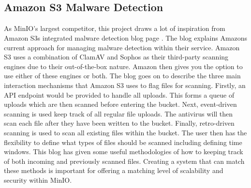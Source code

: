 \documentclass[12pt, conference, final, a4paper, onecolumn, compsoc]{IEEEtran}
\begin{document}
%

%

\subsection*{Amazon S3 Malware Detection} %
\paragraph{}

As MinIO's largest competitor, this project draws a lot of inspiration from
Amazon S3s integrated malware detection blog page \citep{amazon-md}. The blog
explains Amazons current approach for managing malware detection within their
service. Amazon S3 uses a combination of ClamAV and Sophos as their third-party
scanning engines due to their out-of-the-box nature. Amazon then gives you the
option to use either of these engines or both. The blog goes on to describe the
three main interaction mechanisms that Amazon S3 uses to flag files for
scanning. Firstly, an API endpoint would be provided to handle all uploads. This
forms a queue of uploads which are then scanned before entering the bucket.
Next, event-driven scanning is used keep track of all regular file uploads. The
antivirus will then scan each file after they have been written to the bucket.
Finally, retro-driven scanning is used to scan all existing files within the
bucket. The user then has the flexibility to define what types of files should
be scanned including defining time windows. This blog has given some useful
methodologies of how to keeping track of both incoming and previously scanned
files. Creating a system that can match these methods is important for offering
a matching level of scalability and security within MinIO.



\subsection*{} %


\subsection*{} %
\end{document}
